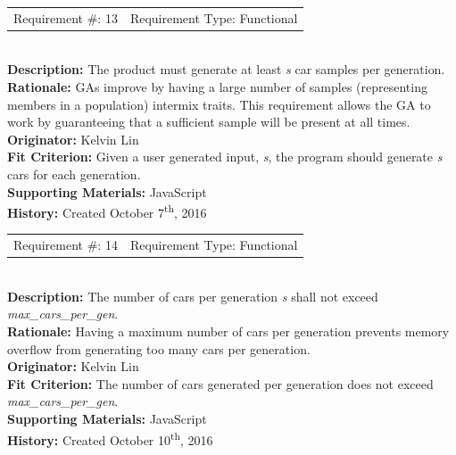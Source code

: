 \documentclass[12pt, titlepage]{article}
\begin{document}
\begin{reqbox}
	\begin{tabular}{cc}
		Requirement \#: 13 & Requirement Type: Functional \\
	\end{tabular} \\
	\textbf{Description:} The product must generate at least \textit{s} car samples 
	per generation. \\
	\textbf{Rationale:}  GAs improve by having a large number of samples 
	(representing members in a population) intermix traits. This requirement allows 
	the GA to work by guaranteeing that a sufficient sample will be present at all 
	times.\\
	\textbf{Originator:} Kelvin Lin\\
	\textbf{Fit Criterion:} Given a user generated input, \textit{s}, the program 
	should generate \textit{s} cars for each generation.\\
	\textbf{Supporting Materials:} JavaScript \\
	\textbf{History:} Created October 7\textsuperscript{th}, 2016
\end{reqbox}

\newpage

\begin{reqbox}
	\begin{tabular}{cc}
		Requirement \#: 14 & Requirement Type: Functional \\
	\end{tabular} \\
	\textbf{Description:} The number of cars per generation \textit{s} shall not 
	exceed \textit{max\_cars\_per\_gen}. \\
	\textbf{Rationale:} Having a maximum number of cars per generation prevents 
	memory overflow from generating too many cars per generation.\\
	\textbf{Originator:} Kelvin Lin\\
	\textbf{Fit Criterion:} The number of cars generated per generation does not 
	exceed \textit{max\_cars\_per\_gen}.\\
	\textbf{Supporting Materials:} JavaScript \\
	\textbf{History:} Created October 10\textsuperscript{th}, 2016
\end{reqbox}
\end{document}
